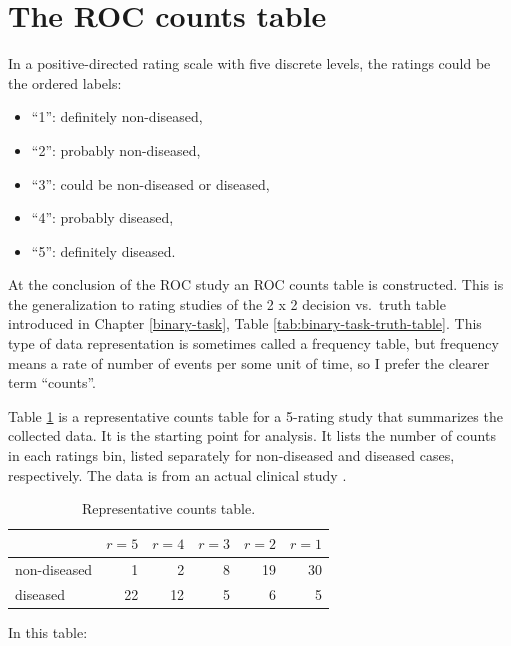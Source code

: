 \documentclass[
]{book}
\providecommand{\tightlist}{%
  \setlength{\itemsep}{0pt}\setlength{\parskip}{0pt}}
\begin{document}
\hypertarget{ratings-paradigm-roc-counts-table}{%
\section{The ROC counts table}\label{ratings-paradigm-roc-counts-table}}

In a positive-directed rating scale with five discrete levels, the ratings could be the ordered labels:

\begin{itemize}
\tightlist
\item
  ``1'': definitely non-diseased,
\item
  ``2'': probably non-diseased,
\item
  ``3'': could be non-diseased or diseased,
\item
  ``4'': probably diseased,
\item
  ``5'': definitely diseased.
\end{itemize}

At the conclusion of the ROC study an ROC counts table is constructed. This is the generalization to rating studies of the 2 x 2 decision vs.~truth table introduced in Chapter \ref{binary-task}, Table \ref{tab:binary-task-truth-table}. This type of data representation is sometimes called a frequency table, but frequency means a rate of number of events per some unit of time, so I prefer the clearer term ``counts''.

Table \ref{tab:ratings-paradigm-example-table} is a representative counts table for a 5-rating study that summarizes the collected data. It is the starting point for analysis. It lists the number of counts in each ratings bin, listed separately for non-diseased and diseased cases, respectively. The data is from an actual clinical study \citep{RN4343}.

\begin{table}

\caption{\label{tab:ratings-paradigm-example-table}Representative counts table.}
\centering
\begin{tabular}[t]{l|r|r|r|r|r}
\hline
  & $r = 5$ & $r = 4$ & $r = 3$ & $r = 2$ & $r = 1$\\
\hline
non-diseased & 1 & 2 & 8 & 19 & 30\\
\hline
diseased & 22 & 12 & 5 & 6 & 5\\
\hline
\end{tabular}
\end{table}

In this table:
\end{document}
